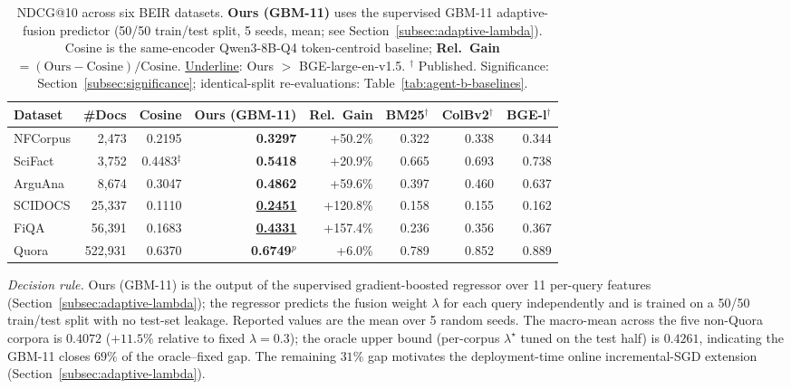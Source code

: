 \documentclass[review,1p]{elsarticle}
\begin{document}
\begin{table}[ht]
\centering
\caption{NDCG@10 across six BEIR datasets. \textbf{Ours (GBM-11)} uses the supervised GBM-11 adaptive-fusion predictor (50/50 train/test split, 5 seeds, mean; see Section~\ref{subsec:adaptive-lambda}). Cosine is the same-encoder Qwen3-8B-Q4 token-centroid baseline; \textbf{Rel.\ Gain} $= (\text{Ours}-\text{Cosine})/\text{Cosine}$. \underline{Underline}: Ours $>$ BGE-large-en-v1.5. $^\dagger$ Published. Significance: Section~\ref{subsec:significance}; identical-split re-evaluations: Table~\ref{tab:agent-b-baselines}.}
\label{tab:main}
\footnotesize
\begin{tabular}{lr|rrr|rrr}
\toprule
Dataset & \#Docs & Cosine & \textbf{Ours (GBM-11)} & Rel.\ Gain & BM25$^\dagger$ & ColBv2$^\dagger$ & BGE-l$^\dagger$ \\
\midrule
NFCorpus & 2{,}473 & 0.2195 & \textbf{0.3297} & +50.2\% & 0.322 & 0.338 & 0.344 \\
SciFact & 3{,}752 & 0.4483$^{\ddagger}$ & \textbf{0.5418} & +20.9\% & 0.665 & 0.693 & 0.738 \\
ArguAna & 8{,}674 & 0.3047 & \textbf{0.4862} & +59.6\% & 0.397 & 0.460 & 0.637 \\
SCIDOCS & 25{,}337 & 0.1110 & \underline{\textbf{0.2451}} & +120.8\% & 0.158 & 0.155 & 0.162 \\
FiQA & 56{,}391 & 0.1683 & \underline{\textbf{0.4331}} & +157.4\% & 0.236 & 0.356 & 0.367 \\
Quora & 522{,}931 & 0.6370 & \textbf{0.6749}$^p$ & +6.0\% & 0.789 & 0.852 & 0.889 \\
\bottomrule
\end{tabular}

\vspace{4pt}
{\footnotesize
\textit{Decision rule.} Ours (GBM-11) is the output of the supervised gradient-boosted regressor over 11 per-query features (Section~\ref{subsec:adaptive-lambda}); the regressor predicts the fusion weight $\lambda$ for each query independently and is trained on a 50/50 train/test split with no test-set leakage. Reported values are the mean over 5 random seeds. The macro-mean across the five non-Quora corpora is $0.4072$ ($+11.5\%$ relative to fixed $\lambda=0.3$); the oracle upper bound (per-corpus $\lambda^\star$ tuned on the test half) is $0.4261$, indicating the GBM-11 closes $69\%$ of the oracle--fixed gap. The remaining $31\%$ gap motivates the deployment-time online incremental-SGD extension (Section~\ref{subsec:adaptive-lambda}).

}
\end{table}
\end{document}
